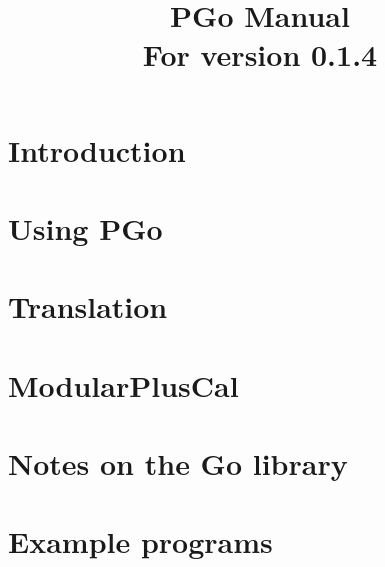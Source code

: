 \documentclass[notitlepage]{article}
\title{PGo Manual\\
	\normalsize{For version 0.1.4}}
\begin{document}
\maketitle

\section{Introduction}


\section{Using PGo}


\section{Translation}


\section{ModularPlusCal} \label{modularpcal}


\section{Notes on the Go library}


\section{Example programs}

\end{document}

